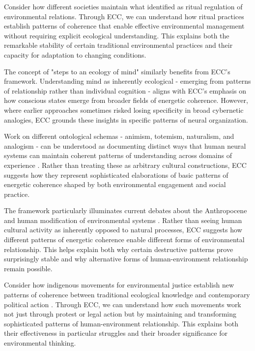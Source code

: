 Consider how different societies maintain what \cite{rappaport1984pigs} identified as ritual regulation of environmental relations. Through ECC, we can understand how ritual practices establish patterns of coherence that enable effective environmental management without requiring explicit ecological understanding. This explains both the remarkable stability of certain traditional environmental practices and their capacity for adaptation to changing conditions.

The concept of "steps to an ecology of mind" \cite{bateson1972steps} similarly benefits from ECC's framework. Understanding mind as inherently ecological - emerging from patterns of relationship rather than individual cognition - aligns with ECC's emphasis on how conscious states emerge from broader fields of energetic coherence. However, where earlier approaches sometimes risked losing specificity in broad cybernetic analogies, ECC grounds these insights in specific patterns of neural organization.

Work on different ontological schemas - animism, totemism, naturalism, and analogism - can be understood as documenting distinct ways that human neural systems can maintain coherent patterns of understanding across domains of experience \cite{descola2013beyond}. Rather than treating these as arbitrary cultural constructions, ECC suggests how they represent sophisticated elaborations of basic patterns of energetic coherence shaped by both environmental engagement and social practice.

The framework particularly illuminates current debates about the Anthropocene and human modification of environmental systems \cite{haraway2016staying}. Rather than seeing human cultural activity as inherently opposed to natural processes, ECC suggests how different patterns of energetic coherence enable different forms of environmental relationship. This helps explain both why certain destructive patterns prove surprisingly stable and why alternative forms of human-environment relationship remain possible.

Consider how indigenous movements for environmental justice establish new patterns of coherence between traditional ecological knowledge and contemporary political action \cite{nadasdy2007gift}. Through ECC, we can understand how such movements work not just through protest or legal action but by maintaining and transforming sophisticated patterns of human-environment relationship. This explains both their effectiveness in particular struggles and their broader significance for environmental thinking.

